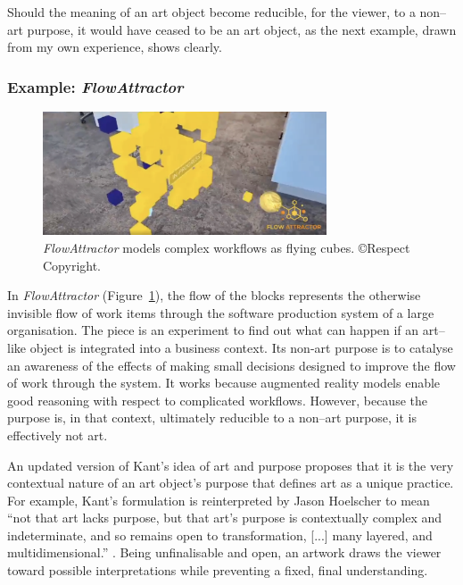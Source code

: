 \documentclass[letter:wpaper]{article}
\begin{document}
    Should the meaning of an art object become reducible, for the viewer, to a non–art purpose, it would have ceased to be an art object, as the next example, drawn from my own experience, shows clearly.

    \subsubsection{Example: \emph{FlowAttractor}}

    \begin{figure}[h]
        \includegraphics[width=3.31in]{flow-attractor.png}
        \caption{\emph{FlowAttractor} models complex workflows as flying cubes. \copyright Respect Copyright.}
        \label{fig:flow-attractor}
    \end{figure}

    In \emph{FlowAttractor} (Figure~\ref{fig:flow-attractor}), the flow of the blocks represents the otherwise invisible flow of work items through the software production system of a large organisation. The piece is an experiment to find out what can happen if an art–like object is integrated into a business context. Its non-art purpose is to catalyse an awareness of the effects of making small decisions designed to improve the flow of work through the system. It works because augmented reality models enable good reasoning with respect to complicated workflows. However, because the purpose is, in that context, ultimately reducible to a non–art purpose, it is effectively not art.
    
    An updated version of Kant's idea of art and purpose proposes that it is the very contextual nature of an art object's purpose that defines art as a unique practice. For example, Kant's formulation is reinterpreted by Jason Hoelscher to mean ``not that art lacks purpose, but that art's purpose is contextually complex and indeterminate, and so remains open to transformation, [...] many layered, and multidimensional.'' \citep[p.25]{HoelscherThPtcsOfPhsSpc2014}. Being unfinalisable and open, an artwork draws the viewer toward possible interpretations while preventing a fixed, final understanding. \citep[p.12]{HoelscherThPtcsOfPhsSpc2014}
    
\end{document}
